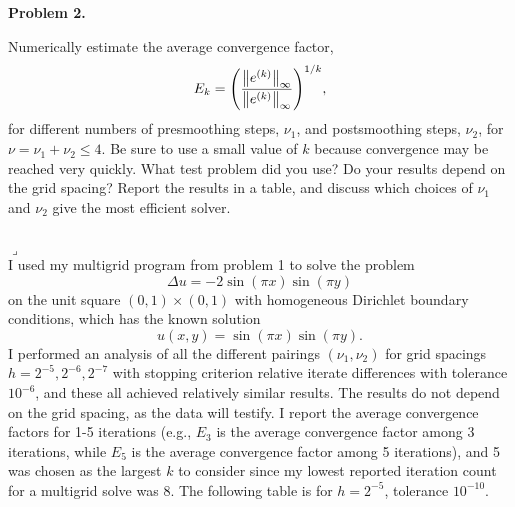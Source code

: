\documentclass[12pt]{article}
\newenvironment{myprob}[1]
    {%
    \noindent{\Huge$\ulcorner$}\textbf{#1.}\begin{em}
    }
    { 
    \end{em} \\ \hphantom{l} \hfill {\Huge$\lrcorner$} }
\begin{document}
\newpage

\begin{verbatim}

\end{verbatim}

\begin{myprob}{Problem 2}
Numerically estimate the average convergence factor,
$$ E_k = \qty(\dfrac{\norm{e^{(k)}}_\infty}{\norm{e^{(k)}}_\infty})^{1/k},$$
for different numbers of presmoothing steps, $\nu_1$, and postsmoothing steps, $\nu_2$, for $\nu = \nu_1 + \nu_2 \leq 4$. Be sure to use a small value of $k$ because convergence may be reached very quickly. What test problem did you use? Do your results depend on the grid spacing? Report the results in a table, and discuss which choices of $\nu_1$ and $\nu_2$ give the most efficient solver. \\
\end{myprob} \\
I used my multigrid program from problem 1 to solve the problem
$$
\Delta u = -2 \sin(\pi x) \sin(\pi y)
$$
on the unit square $(0, 1)\times(0, 1)$ with homogeneous Dirichlet boundary conditions, which has the known solution $$u(x,y) = \sin(\pi x) \sin(\pi y).$$
I performed an analysis of all the different pairings $(\nu_1, \nu_2)$ for grid spacings $h=2^{-5}, 2^{-6}, 2^{-7}$ with stopping criterion relative iterate differences with tolerance $10^{-6}$, and these all achieved relatively similar results. The results do not depend on the grid spacing, as the data will testify. I report the average convergence factors for 1-5 iterations (e.g., $E_3$ is the average convergence factor among 3 iterations, while $E_5$ is the average convergence factor among 5 iterations), and 5 was chosen as the largest $k$ to consider since my lowest reported iteration count for a multigrid solve was 8.  
The following table is for $h=2^{-5}$, tolerance $10^{-10}$.\\
\end{document}
